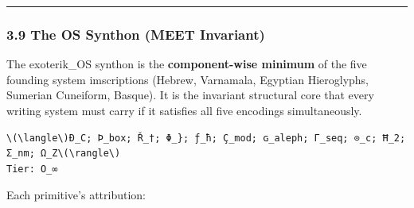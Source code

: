 \begin{center}\rule{0.5\linewidth}{0.5pt}\end{center}

\subsubsection{3.9 The OS Synthon (MEET
Invariant)}\label{the-os-synthon-meet-invariant}

The exoterik\_OS synthon is the \textbf{component-wise minimum} of the
five founding system imscriptions (Hebrew, Varnamala, Egyptian
Hieroglyphs, Sumerian Cuneiform, Basque). It is the invariant structural
core that every writing system must carry if it satisfies all five
encodings simultaneously.

\begin{verbatim}
\(\langle\)Ð_C; Þ_box; Ř_†; Φ_}; ƒ_ħ; Ç_mod; ɢ_aleph; Γ_seq; ⊙_c; Ħ_2; Σ_nm; Ω_Z\(\rangle\)
Tier: O_∞
\end{verbatim}

Each primitive's attribution:

